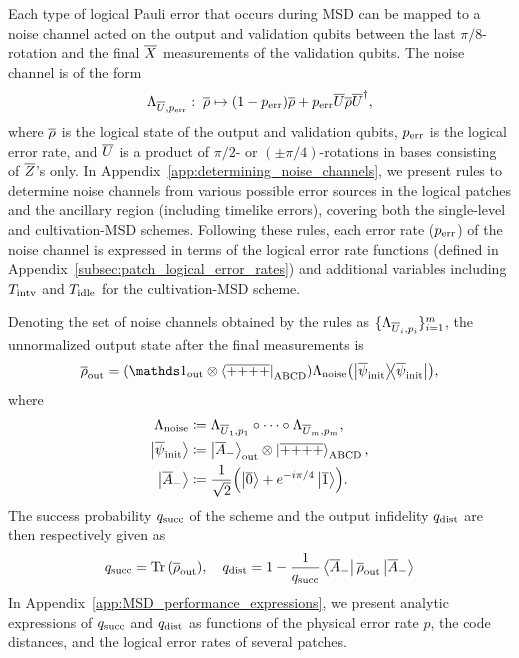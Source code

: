 \documentclass[
 prx,
 reprint,
 superscriptaddress,
 longbibliography,
 dvipsnames
]{revtex4-2}
\begin{document}
Each type of logical Pauli error that occurs during MSD can be mapped to a noise channel acted on the output and validation qubits between the last $\pi/8$-rotation and the final $\overline{X}$ measurements of the validation qubits.
The noise channel is of the form
\begin{align*}
    \Lambda_{\overline{U},p_{\mathrm{err}}}: \; \overline{\rho} \mapsto (1 - p_{\mathrm{err}})\overline{\rho} + p_{\mathrm{err}} \overline{U} \overline{\rho} \overline{U}^\dagger,
\end{align*}
where $\overline{\rho}$ is the logical state of the output and validation qubits, $p_{\mathrm{err}}$ is the logical error rate, and $\overline{U}$ is a product of $\pi/2$- or $(\pm \pi/4)$-rotations in bases consisting of $\overline{Z}$'s only.
In Appendix~\ref{app:determining_noise_channels}, we present rules to determine noise channels from various possible error sources in the logical patches and the ancillary region (including timelike errors), covering both the single-level and cultivation-MSD schemes.
Following these rules, each error rate ($p_{\mathrm{err}}$) of the noise channel is expressed in terms of the logical error rate functions (defined in Appendix~\ref{subsec:patch_logical_error_rates}) and additional variables including $T_{\mathrm{intv}}$ and $T_{\mathrm{idle}}$ for the cultivation-MSD scheme.

Denoting the set of noise channels obtained by the rules as $\{\Lambda_{\overline{U}_i, p_i}\}_{i=1}^{m}$, the unnormalized output state after the final measurements is
\begin{align*}
    \lgc{\rho}_\mr{out} = (\identity_\mr{out} \otimes \bra{\lgc{+}\lgc{+}\lgc{+}\lgc{+}}_\mr{ABCD}) \Lambda_\mr{noise} \qty(\ketbra{\lgc{\psi}_\mr{init}}),
\end{align*}
where
\begin{align*}
    \Lambda_{\mathrm{noise}} &\coloneqq \Lambda_{\overline{U}_1,p_1} \circ \cdots \circ \Lambda_{\overline{U}_m,p_m}, \\
    \ket{\overline{\psi}_{\mathrm{init}}} &\coloneqq \ket{\overline{A}_-}_{\mathrm{out}} \otimes \ket{\overline{+}\overline{+}\overline{+}\overline{+}}_{\mathrm{ABCD}}, \\
    \ket{\overline{A}_-} &\coloneqq \frac{1}{\sqrt{2}} \qty(\ket{\overline{0}} + e^{-i\pi/4}\ket{\overline{1}}).
\end{align*}
The success probability $q_{\mathrm{succ}}$ of the scheme and the output infidelity $q_{\mathrm{dist}}$ are then respectively given as
\begin{align*}
    q_{\mathrm{succ}} = \Tr\qty(\overline{\rho}_{\mathrm{out}}), \quad
    q_{\mathrm{dist}} = 1 - \frac{1}{q_{\mathrm{succ}}} \bra{\overline{A}_-} \overline{\rho}_{\mathrm{out}} \ket{\overline{A}_-}
\end{align*}
In Appendix~\ref{app:MSD_performance_expressions}, we present analytic expressions of $q_{\mathrm{succ}}$ and $q_{\mathrm{dist}}$ as functions of the physical error rate $p$, the code distances, and the logical error rates of several patches.
\end{document}
